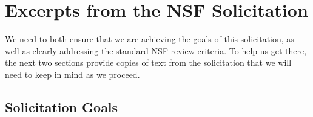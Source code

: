 \newpage
\section{Excerpts from the NSF Solicitation}

We need to both ensure
that we are achieving the goals of this solicitation, as well as clearly
addressing the standard NSF review criteria.  To help us get there, the
next two sections provide copies of text from the solicitation that
we will need to keep in mind as we proceed.

\subsection{Solicitation Goals}
\label{sec:solicitation}

